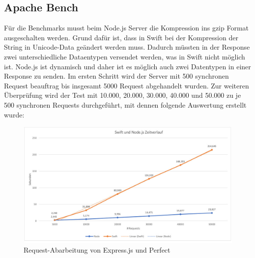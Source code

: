 \begin{figure}[h]
\end{figure}

\subsection{Apache Bench}

Für die Benchmarks musst beim Node.js Server die Kompression ins gzip Format ausgeschalten werden. Grund dafür ist, dass in Swift bei der Kompression der String in Unicode-Data geändert werden muss. Dadurch müssten in der Response zwei unterschiedliche Dataentypen versendet werden, was in Swift nicht möglich ist. Node.js ist dynamisch und daher ist es möglich auch zwei Datentypen in einer Response zu senden. Im ersten Schritt wird der Server mit 500 synchronen Request beauftrag bis insgesamt 5000 Request abgehandelt wurden. Zur weiteren Überprüfung wird der Test mit 10.000, 20.000, 30.000, 40.000 und 50.000 zu je 500 synchronen Requests durchgeführt, mit dennen folgende Auswertung erstellt wurde:

\begin{figure}[h]
\centering
\includegraphics[keepaspectratio, scale = 0.5]{images/time.jpg}
\caption{Request-Abarbeitung von Express.js und Perfect}
\label{fig:time}
\end{figure}

